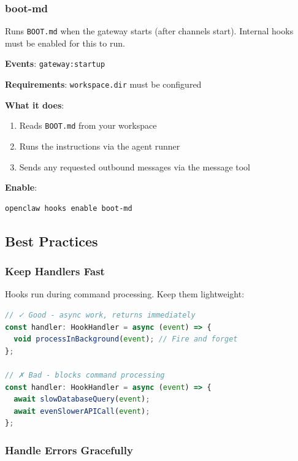 \subsubsection{boot-md}


Runs \texttt{BOOT.md} when the gateway starts (after channels start).
Internal hooks must be enabled for this to run.

\textbf{Events}: \texttt{gateway:startup}

\textbf{Requirements}: \texttt{workspace.dir} must be configured

\textbf{What it does}:

\begin{enumerate}
  \item Reads \texttt{BOOT.md} from your workspace
  \item Runs the instructions via the agent runner
  \item Sends any requested outbound messages via the message tool
\end{enumerate}


\textbf{Enable}:

\begin{lstlisting}[language=bash]
openclaw hooks enable boot-md
\end{lstlisting}


\subsection{Best Practices}


\subsubsection{Keep Handlers Fast}


Hooks run during command processing. Keep them lightweight:

\begin{lstlisting}[language=typescript]
// ✓ Good - async work, returns immediately
const handler: HookHandler = async (event) => {
  void processInBackground(event); // Fire and forget
};

// ✗ Bad - blocks command processing
const handler: HookHandler = async (event) => {
  await slowDatabaseQuery(event);
  await evenSlowerAPICall(event);
};
\end{lstlisting}


\subsubsection{Handle Errors Gracefully}


